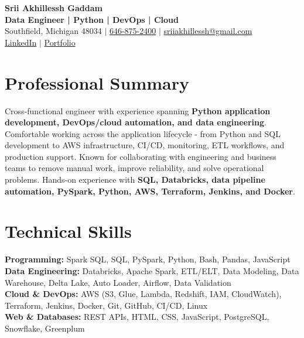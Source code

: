 \documentclass[letterpaper,10pt]{article}
\begin{document}
\fontsize{9.35pt}{10.45pt}\selectfont

\begin{center}
    {\LARGE \textbf{Srii Akhillessh Gaddam}} \\[-1pt]
    \textbf{Data Engineer | Python | DevOps | Cloud} \\[2pt]
    Southfield, Michigan 48034 $|$
    \href{tel:6468752400}{646-875-2400} $|$
    \href{mailto:sriiakhillessh@gmail.com}{sriiakhillessh@gmail.com} \\[1pt]
    \href{https://www.linkedin.com/in/srii-akhiilessh-gaddam-b48668191/}{LinkedIn} $|$
    \href{https://sriiakhillesshg.github.io/portfolio/}{Portfolio}
\end{center}
\vspace{-8pt}

\section{Professional Summary}
\small{Cross-functional engineer with experience spanning \textbf{Python application development, DevOps/cloud automation, and data engineering}. Comfortable working across the application lifecycle - from Python and SQL development to AWS infrastructure, CI/CD, monitoring, ETL workflows, and production support. Known for collaborating with engineering and business teams to remove manual work, improve reliability, and solve operational problems. Hands-on experience with \textbf{SQL, Databricks, data pipeline automation, PySpark, Python, AWS, Terraform, Jenkins, and Docker}.}

\section{Technical Skills}
\small{
\textbf{Programming:} Spark SQL, SQL, PySpark, Python, Bash, Pandas, JavaScript \\
\textbf{Data Engineering:} Databricks, Apache Spark, ETL/ELT, Data Modeling, Data Warehouse, Delta Lake, Auto Loader, Airflow, Data Validation \\
\textbf{Cloud \& DevOps:} AWS (S3, Glue, Lambda, Redshift, IAM, CloudWatch), Terraform, Jenkins, Docker, Git, GitHub, CI/CD, Linux \\
\textbf{Web \& Databases:} REST APIs, HTML, CSS, JavaScript, PostgreSQL, Snowflake, Greenplum
}
\end{document}
